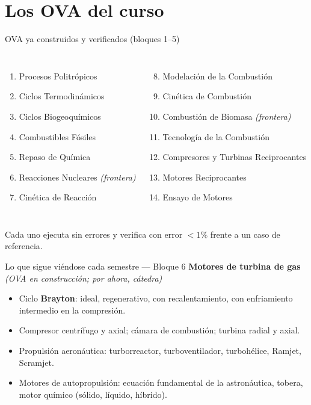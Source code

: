 \documentclass[aspectratio=169]{beamer}
\begin{document}
\section{Los OVA del curso}
\begin{frame}{OVA ya construidos y verificados (bloques 1–5)}
  \small
  \begin{columns}[T]
      \begin{enumerate}
        \item Procesos Politrópicos
        \item Ciclos Termodinámicos
        \item Ciclos Biogeoquímicos
        \item Combustibles Fósiles
        \item Repaso de Química
        \item[5b.] Reacciones Nucleares \emph{(frontera)}
        \item Cinética de Reacción
      \end{enumerate}
      \begin{enumerate}
        \setcounter{enumi}{7}
        \item Modelación de la Combustión
        \item Cinética de Combustión
        \item[8b.] Combustión de Biomasa \emph{(frontera)}
        \item Tecnología de la Combustión
        \item Compresores y Turbinas Reciprocantes
        \item Motores Reciprocantes
        \item Ensayo de Motores
      \end{enumerate}
  \end{columns}
  \vspace{0.3cm}
  \footnotesize Cada uno ejecuta sin errores y verifica con error $<1\%$ frente a un caso de referencia.
\end{frame}

\begin{frame}{Lo que sigue viéndose cada semestre — Bloque 6}
  \textbf{Motores de turbina de gas} \emph{(OVA en construcción; por ahora, cátedra)}
  \begin{itemize}
    \item Ciclo \textbf{Brayton}: ideal, regenerativo, con recalentamiento, con enfriamiento intermedio en
      la compresión.
    \item Compresor centrífugo y axial; cámara de combustión; turbina radial y axial.
    \item Propulsión aeronáutica: turborreactor, turboventilador, turbohélice, Ramjet, Scramjet.
    \item Motores de autopropulsión: ecuación fundamental de la astronáutica, tobera, motor químico
      (sólido, líquido, híbrido).
  \end{itemize}
\end{frame}
\end{document}
